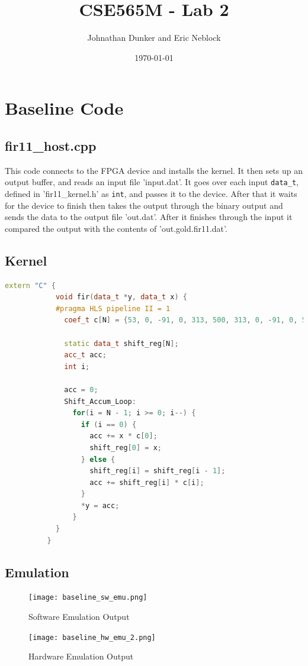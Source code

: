 \documentclass[11pt]{article}
\title{CSE565M - Lab 2}
\author{Johnathan Dunker and Eric Neblock}
\date{\today}
\begin{document}
\maketitle

    \section{Baseline Code}
      \subsection{fir11\_host.cpp}
      This code connects to the FPGA device and installs the kernel. It then sets up an output buffer, and reads an input file 'input.dat'. It goes over each input \texttt{data\_t}, defined in 'fir11\_kernel.h' as \texttt{int}, and passes it to the device. After that it waits for the device to finish then takes the output through the binary output and sends the data to the output file 'out.dat'. After it finishes through the input it compared the output with the contents of 'out.gold.fir11.dat'.

      \pagebreak[3]
      \subsection{Kernel}
        \begin{lstlisting}[style=HLSstyle, language=C++]
          extern "C" {
            void fir(data_t *y, data_t x) {
            #pragma HLS pipeline II = 1
              coef_t c[N] = {53, 0, -91, 0, 313, 500, 313, 0, -91, 0, 53};

              static data_t shift_reg[N];
              acc_t acc;
              int i;

              acc = 0;
              Shift_Accum_Loop:
                for(i = N - 1; i >= 0; i--) {
                  if (i == 0) {
                    acc += x * c[0];
                    shift_reg[0] = x;
                  } else {
                    shift_reg[i] = shift_reg[i - 1];
                    acc += shift_reg[i] * c[i];
                  }
                  *y = acc;
                }
            }
          }
        \end{lstlisting}
      \pagebreak[3]
      \subsection{Emulation}
      \begin{figure}[H]
        \centering
        \texttt{[image: baseline\_sw\_emu.png]}
        \caption{Software Emulation Output}
        \label{fig:bl_sw_emu_out}
      \end{figure}
      \begin{figure}[H]
        \centering
        \texttt{[image: baseline\_hw\_emu\_2.png]}
        \caption{Hardware Emulation Output}
        \label{fig:bl_hw_emu_out}
      \end{figure}
    
\end{document}
